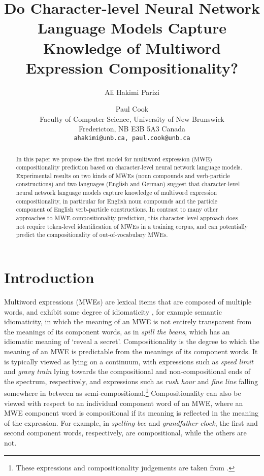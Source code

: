 \documentclass[11pt]{article}
\title{Do Character-level Neural Network Language Models Capture Knowledge of Multiword Expression Compositionality?
}
\author{Ali Hakimi Parizi \and Paul Cook \\
Faculty of Computer Science, University of New Brunswick\\
Fredericton, NB E3B 5A3 Canada\\
\tt{ahakimi@unb.ca}, \tt{paul.cook@unb.ca}}
\date{}
\begin{document}
\maketitle
\begin{abstract}
In this paper we propose the first model for multiword expression
(MWE) compositionality prediction based on character-level neural
network language models. Experimental results on two kinds of MWEs
(noun compounds and verb-particle constructions) and two languages
(English and German) suggest that character-level neural network
language models capture knowledge of multiword expression
compositionality, in particular for English noun compounds and the
particle component of English verb-particle constructions. In contrast
to many other approaches to MWE compositionality prediction, this
character-level approach does not require token-level identification
of MWEs in a training corpus, and can potentially predict the
compositionality of out-of-vocabulary MWEs.
\end{abstract}

\section{Introduction}

Multiword expressions (MWEs) are lexical items that are composed of
multiple words, and exhibit some degree of idiomaticity
\citep{baldwin2010multiword}, for example semantic idiomaticity, in
which the meaning of an MWE is not entirely transparent from the
meanings of its component words, as in \emph{spill the beans}, which
has an idiomatic meaning of `reveal a secret'. Compositionality is the
degree to which the meaning of an MWE is predictable from the meanings
of its component words. It is typically viewed as lying on a
continuum, with expressions such as \emph{speed limit} and \emph{gravy
  train} lying towards the compositional and non-compositional ends of
the spectrum, respectively, and expressions such as \emph{rush hour}
and \emph{fine line} falling somewhere in between as
semi-compositional.\footnote{These expressions and compositionality
  judgements are taken from \cite{reddy2011empirical}.}
Compositionality can also be viewed with respect to an individual
component word of an MWE, where an MWE component word is compositional
if its meaning is reflected in the meaning of the expression. For
example, in \emph{spelling bee} and \emph{grandfather clock}, the
first and second component words, respectively, are compositional,
while the others are not.
\end{document}
